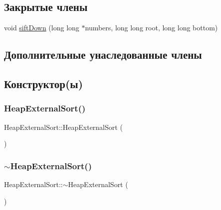 \subsection*{Закрытые члены}
\begin{DoxyCompactItemize}
\item 
void \hyperlink{class_heap_external_sort_a927eea9dcf44a9c7d53db1039bc7e21f}{sift\+Down} (long long $\ast$numbers, long long root, long long bottom)
\end{DoxyCompactItemize}
\subsection*{Дополнительные унаследованные члены}


\subsection{Конструктор(ы)}
\hypertarget{class_heap_external_sort_a9e6236e47430f0b530b287a6d7cf3a8b}{}\label{class_heap_external_sort_a9e6236e47430f0b530b287a6d7cf3a8b} 
\subsubsection{\texorpdfstring{Heap\+External\+Sort()}{HeapExternalSort()}}
{\footnotesize\ttfamily Heap\+External\+Sort\+::\+Heap\+External\+Sort (\begin{DoxyParamCaption}{ }\end{DoxyParamCaption})}

\hypertarget{class_heap_external_sort_afa76473510a8cb610bb94bca5b5202c9}{}\label{class_heap_external_sort_afa76473510a8cb610bb94bca5b5202c9} 
\subsubsection{\texorpdfstring{$\sim$\+Heap\+External\+Sort()}{~HeapExternalSort()}}
{\footnotesize\ttfamily Heap\+External\+Sort\+::$\sim$\+Heap\+External\+Sort (\begin{DoxyParamCaption}{ }\end{DoxyParamCaption})}



